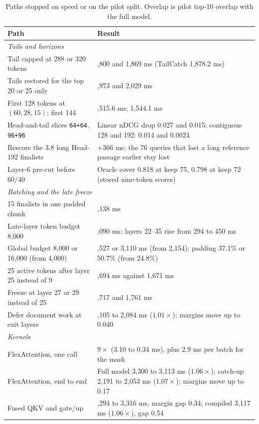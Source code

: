\documentclass[11pt, a4paper]{article}
\begin{document}
\begin{table}[h]
\centering
\small
\caption{Paths stopped on speed or on the pilot split. Overlap is pilot top-10 overlap with the full model.}
\label{tab:speed}
\begin{tabular}{l>{\raggedright\arraybackslash}p{7.4cm}}
\toprule
Path & Result \\
\midrule
\multicolumn{2}{l}{\emph{Tails and horizons}} \\
Tail capped at 288 or 320 tokens & 1,800 and 1,869 ms (TailCatch 1,878.2 ms) \\
Tails restored for the top 20 or 25 only & 1,973 and 2,029 ms \\
First 128 tokens at $(60, 28, 15)$; first 144 & 1,515.6 ms; 1,544.1 ms \\
Head-and-tail slices \texttt{64+64}, \texttt{96+96} & Linear nDCG drop 0.027 and 0.015; contiguous 128 and 192: 0.014 and 0.0024 \\
Rescore the 3.8 long Head-192 finalists & $+366$ ms; the 76 queries that lost a long reference passage earlier stay lost \\
Layer-6 pre-cut before $60/40$ & Oracle cover 0.818 at keep 75, 0.798 at keep 72 (stored nine-token scores) \\
\midrule
\multicolumn{2}{l}{\emph{Batching and the late freeze}} \\
15 finalists in one padded chunk & 2,138 ms \\
Late-layer token budget 8,000 & 2,090 ms; layers 22--35 rise from 294 to 450 ms \\
Global budget 8,000 or 16,000 (from 4,000) & 2,527 or 3,110 ms (from 2,154); padding 37.1\% or 50.7\% (from 24.8\%) \\
25 active tokens after layer 25 instead of 9 & 1,694 ms against 1,671 ms \\
Freeze at layer 27 or 29 instead of 25 & 1,717 and 1,761 ms \\
Defer document work at exit layers & 2,105 to 2,084 ms ($1.01\times$); margins move up to 0.040 \\
\midrule
\multicolumn{2}{l}{\emph{Kernels}} \\
FlexAttention, one call & $9\times$ (3.10 to 0.34 ms), plus 2.9 ms per batch for the mask \\
FlexAttention, end to end & Full model 3,300 to 3,113 ms ($1.06\times$); catch-up 2,191 to 2,053 ms ($1.07\times$); margins move up to 0.17 \\
Fused QKV and gate/up & 3,294 to 3,316 ms, margin gap 0.34; compiled 3,117 ms ($1.06\times$), gap 0.54 \\

\end{tabular}
\end{table}
\end{document}
